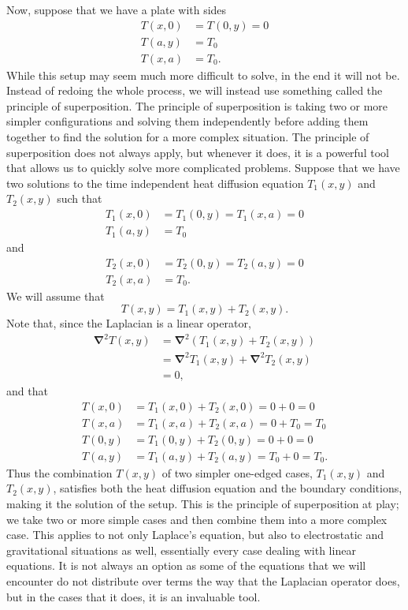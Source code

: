 \documentclass[11pt]{report}
\newcommand{\fpar}[1]{\left({#1}\right)}
\newcommand{\del}{\pmb{\nabla}}
\begin{document}
Now, suppose that we have a plate with sides
    \begin{align*}
        T(x,0) &= T(0,y) = 0\\
        T(a,y) &= T_0\\
        T(x,a) &= T_0.
    \end{align*}
While this setup may seem much more difficult to solve, in the end it will not be. %
Instead of redoing the whole process, we will instead use something called the principle of superposition. The principle of superposition is taking two or more simpler configurations and solving them independently before adding them together to find the solution for a more complex situation. The principle of superposition does not always apply, but whenever it does, it is a powerful tool that allows us to quickly solve more complicated problems. Suppose that we have two solutions to the time independent heat diffusion equation  $T_1(x,y)$ and $T_2(x,y)$ such that
    \begin{align*}
        T_1(x,0) &= T_1(0,y) = T_1(x,a) = 0\\
        T_1(a,y) &= T_0
    \end{align*}
and 
    \begin{align*}
        T_2(x,0) &= T_2(0,y) = T_2(a,y) = 0\\
        T_2(x,a) &= T_0.
    \end{align*}
We will assume that
    \[T(x,y)=T_1(x,y)+T_2(x,y).\]
Note that, since the Laplacian is a linear operator,
    \begin{align*}
        \del^2T(x,y) &= \del^2\fpar{T_1(x,y)+T_2(x,y)}\\
        &= \del^2T_1(x,y)+\del^2T_2(x,y)\\
        &= 0,
    \end{align*}
and that
    \begin{align*}
        T(x,0) &= T_1(x,0)+T_2(x,0) = 0+0=0\\
        T(x,a) &= T_1(x,a)+T_2(x,a) = 0 + T_0 = T_0\\
        T(0,y) &= T_1(0,y)+T_2(0,y) = 0 + 0 = 0\\
        T(a,y) &= T_1(a,y)+T_2(a,y) = T_0 + 0 = T_0.
    \end{align*}
Thus the combination $T(x,y)$ of two simpler one-edged cases, $T_1(x,y)$ and $T_2(x,y)$, satisfies both the heat diffusion equation and the boundary conditions, making it the solution of the setup. This is the principle of superposition at play; we take two or more simple cases and then combine them into a more complex case. This applies to not only Laplace's equation, but also to electrostatic and gravitational situations as well, essentially every case dealing with linear equations. It is not always an option as some of the equations that we will encounter do not distribute over terms the way that the Laplacian operator does, but in the cases that it does, it is an invaluable tool. 
\end{document}

